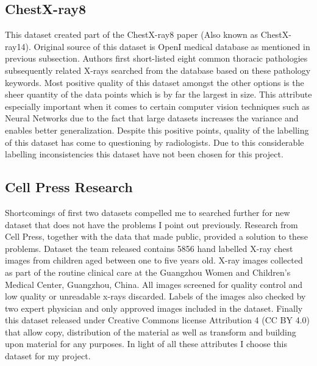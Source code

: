 \documentclass[12pt, twoside, a4paper]{article}
\begin{document}
\subsection{ChestX-ray8}
This dataset created part of the ChestX-ray8\cite{ChestX-ray8} paper (Also known as ChestX-ray14). Original source of this dataset is OpenI\cite{openi} medical database as mentioned in previous subsection. Authors first short-listed eight common thoracic pathologies subsequently related X-rays searched from the database based on these pathology keywords. Most positive quality of this dataset amongst the other options is the sheer quantity of the data points which is by far the largest in size. This attribute especially important when it comes to certain computer vision techniques such as Neural Networks due to the fact that large datasets increases the variance and enables better generalization. Despite this positive points, quality of the labelling of this dataset has come to questioning by radiologists\cite{counterray8}. Due to this considerable labelling inconsistencies this dataset have not been chosen for this project.

\subsection{Cell Press Research}
Shortcomings of first two datasets compelled me to searched further for new dataset that does not have the problems I point out previously. Research from Cell Press\cite{dataset}, together with the data that made public, provided a solution to these problems. Dataset the team released contains 5856 hand labelled X-ray chest images from children aged between one to five years old. X-ray images collected as part of the routine clinical care at the Guangzhou Women and Children’s Medical Center, Guangzhou, China. All images screened for quality control and low quality or unreadable x-rays discarded. Labels of the images also checked by two expert physician and only approved images included in the dataset. Finally this dataset released under Creative Commons license Attribution 4 (CC BY 4.0) that allow copy, distribution of the material as well as transform and building upon material for any purposes. In light of all these attributes I choose this dataset for my project.

\clearpage
\end{document}
